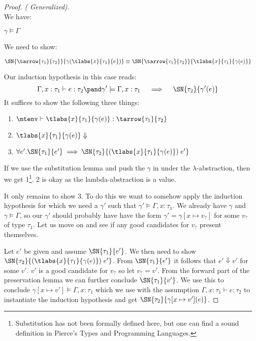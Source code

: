 \begin{proof}[Proof. ( Generalized)]
\case{\TAbs} \\
We have:
\begin{description}
  \item $\gamma \models \Gamma$
\end{description}
We need to show:
\begin{description}
  \item $\SN{\tarrow{\tau_1}{\tau_2}}{\gamma(\tlabs{x}{\tau_1}{e})} \equiv \SN{\tarrow{\tau_1}{\tau_2}}{\tlabs{x}{\tau_1}{\gamma(e)}}$
\end{description}
Our induction hypothesis in this case reads:
\[
  \Gamma,x:\tau_1 \vdash e : \tau_2 \pand \gamma' \models \Gamma, x : \tau_1 \quad \implies \quad \SN{\tau_2}{\gamma'(e)}
\]
It suffices to show the following three things:
\begin{enumerate}
\item $\mtenv \vdash \tlabs{x}{\tau_1}{\gamma(e)} : \tarrow{\tau_1}{\tau_2}$
\item $\tlabs{x}{\tau_1}{\gamma(e)} \Downarrow$
\item $\forall e'. \SN{\tau_1}{e'} \implies \SN{\tau_2}{(\tlabs{x}{\tau_1}{\gamma(e)}) \; e'}$
\end{enumerate}
If we use the substitution lemma and push the $\gamma$ in under the $\lambda$-abstraction, then we get 1\footnote{Substitution has not been formally defined here, but one can find a sound definition in Pierce's Types and Programming Languages.}. 2 is okay as the lambda-abstraction is a value.

It only remains to show 3. To do this we want to somehow apply the induction hypothesis for which we need a $\gamma'$ such that $\gamma' \models \Gamma, x:\tau_1$. We already have $\gamma$ and $\gamma \models \Gamma$, so our $\gamma'$ should probably have have the form $\gamma' = \gamma[x \mapsto v_?]$ for some $v_?$ of type $\tau_1$. Let us move on and see if any good candidates for $v_?$ present themselves.

Let $e'$ be given and assume $\SN{\tau_1}{e'}$. We then need to show $\SN{\tau_2}{(\tlabs{x}{\tau_1}{\gamma(e)}) \; e'}$. From $\SN{\tau_1}{e'}$ it follows that $e' \Downarrow v'$ for some $v'$. $v'$ is a good candidate for $v_?$ so let $v_? = v'$. From the forward part of the preservation lemma we can further conclude $\SN{\tau_1}{v'}$. We use this to conclude $\gamma[x\mapsto v'] \models \Gamma, x:\tau_1$ which we use with the assumption $\Gamma,x:\tau_1 \vdash e : \tau_2$ to instantiate the induction hypothesis and get $\SN{\tau_2}{\gamma[x\mapsto v'](e)}$.


\end{proof}
